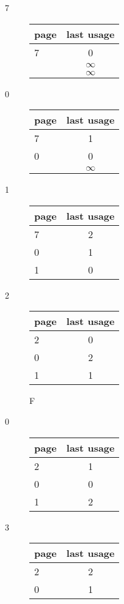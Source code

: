 \documentclass[12pt]{article}
\begin{document}
\begin{enumerate}[a]
\begin{multicols}{2}
		\begin{description}
			\item[7]
			\begin{tabular}{|p{2em}|c|}
				page & last usage \\
				\hline
				7 & 0\\
				\hline
				& $\infty$ \\
				\hline
				& $\infty$ \\
				\hline
			\end{tabular}
			\item[0]
			\begin{tabular}{|p{2em}|c|}
				page & last usage \\
				\hline
				7 & 1\\
				\hline
				0 & 0 \\
				\hline
				& $\infty$ \\
				\hline
			\end{tabular}
			\item[1]
			\begin{tabular}{|p{2em}|c|}
				page & last usage \\
				\hline
				7 & 2\\
				\hline
				0 & 1 \\
				\hline
				1 & 0 \\
				\hline
			\end{tabular}
			\item[2]
			\begin{tabular}{|p{2em}|c|}
				page & last usage \\
				\hline
				2 & 0\\
				\hline
				0 & 2 \\
				\hline
				1 & 1 \\
				\hline
			\end{tabular}
			F
			\item[0]
			\begin{tabular}{|p{2em}|c|}
				page & last usage \\
				\hline
				2 & 1\\
				\hline
				0 & 0 \\
				\hline
				1 & 2 \\
				\hline
			\end{tabular}
			\item[3]
			\begin{tabular}{|p{2em}|c|}
				page & last usage \\
				\hline
				2 & 2\\
				\hline
				0 & 1 \\

\end{tabular}
\end{description}
\end{multicols}
\end{enumerate}
\end{document}
